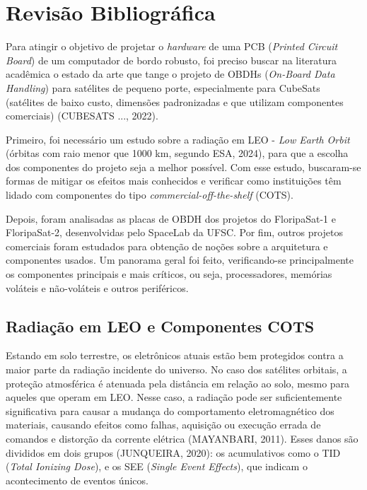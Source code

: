 \chapter{Revisão Bibliográfica}

Para atingir o objetivo de projetar o \textit{hardware} de uma PCB (\textit{Printed Circuit Board}) de um computador de bordo robusto, foi preciso buscar na literatura acadêmica o estado da arte que tange o projeto de OBDHs (\textit{On-Board Data Handling}) para satélites de pequeno porte, especialmente para CubeSats (satélites de baixo custo, dimensões padronizadas e que utilizam componentes comerciais) (CUBESATS ..., 2022).
 
Primeiro, foi necessário um estudo sobre a radiação em LEO - \textit{Low Earth Orbit} (órbitas com raio menor que 1000 km, segundo ESA, 2024), para que a escolha dos componentes do projeto seja a melhor possível. Com esse estudo, buscaram-se formas de mitigar os efeitos mais conhecidos e verificar como instituições têm lidado com componentes do tipo \textit{commercial-off-the-shelf} (COTS).%

Depois, foram analisadas as placas de OBDH dos projetos do FloripaSat-1 e FloripaSat-2, desenvolvidas pelo SpaceLab da UFSC. Por fim, outros projetos comerciais foram estudados para obtenção de noções sobre a arquitetura e componentes usados. Um panorama geral foi feito, verificando-se principalmente os componentes principais e mais críticos, ou seja, processadores, memórias voláteis e não-voláteis e outros periféricos.

\section{Radiação em LEO e Componentes COTS}

Estando em solo terrestre, os eletrônicos atuais estão bem protegidos contra a maior parte da radiação incidente do universo. No caso dos satélites orbitais, a proteção atmosférica é atenuada pela distância em relação ao solo, mesmo para aqueles que operam em LEO. Nesse caso, a radiação pode ser suficientemente significativa para causar a mudança do comportamento eletromagnético dos materiais, causando efeitos como falhas, aquisição ou execução errada de comandos e distorção da corrente elétrica (MAYANBARI, 2011).  Esses danos são divididos em dois grupos (JUNQUEIRA, 2020): os acumulativos como o TID (\textit{Total Ionizing Dose}), e os SEE (\textit{Single Event Effects}), que indicam o acontecimento de eventos únicos. 

